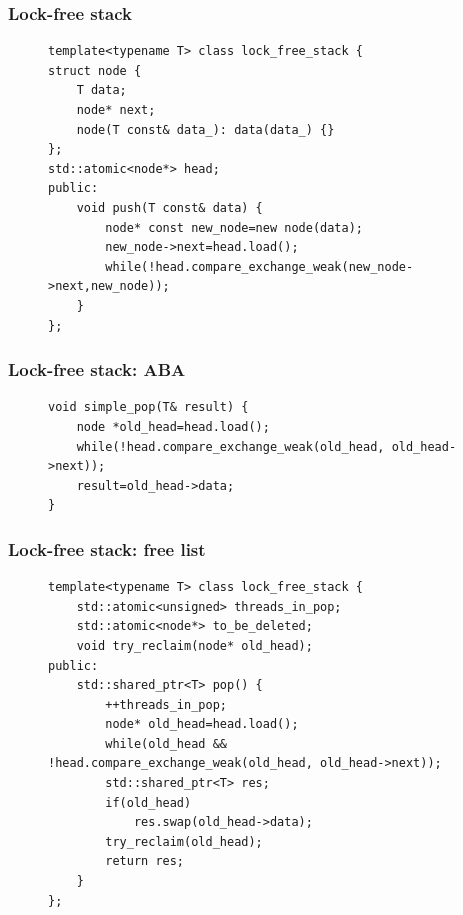 \documentclass[aspectratio=169, pdf, 8pt, unicode]{beamer}
\begin{document}
\begin{frame}[fragile]
\frametitle{Lock-free stack}
\begin{figure}[H]
\begin{minipage}{0.8\textwidth}
\begin{verbatim}
template<typename T> class lock_free_stack {
struct node {
    T data;
    node* next;
    node(T const& data_): data(data_) {}
};
std::atomic<node*> head;
public:
    void push(T const& data) {
        node* const new_node=new node(data);
        new_node->next=head.load();
        while(!head.compare_exchange_weak(new_node->next,new_node));
    }
};
\end{verbatim}
\end{minipage}
\end{figure}
\end{frame}

\begin{frame}[fragile]
\frametitle{Lock-free stack: ABA}
\begin{figure}[H]
\begin{minipage}{0.8\textwidth}
\begin{verbatim}
void simple_pop(T& result) {
    node *old_head=head.load();
    while(!head.compare_exchange_weak(old_head, old_head->next));
    result=old_head->data;
}
\end{verbatim}
\end{minipage}
\end{figure}
\end{frame}

\begin{frame}[fragile]
\frametitle{Lock-free stack: free list}
\begin{figure}[H]
\begin{minipage}{0.8\textwidth}
\begin{verbatim}
template<typename T> class lock_free_stack {
    std::atomic<unsigned> threads_in_pop;
    std::atomic<node*> to_be_deleted;
    void try_reclaim(node* old_head);
public:
    std::shared_ptr<T> pop() {
        ++threads_in_pop;
        node* old_head=head.load();
        while(old_head && !head.compare_exchange_weak(old_head, old_head->next));
        std::shared_ptr<T> res;
        if(old_head)
            res.swap(old_head->data);
        try_reclaim(old_head);
        return res;
    }
};
\end{verbatim}
\end{minipage}
\end{figure}
\end{frame}
\end{document}
